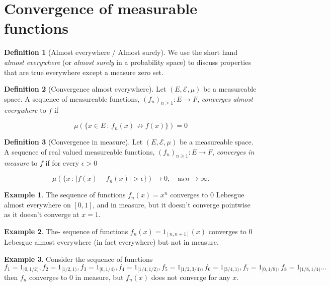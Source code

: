 \documentclass[
]{book}
\theoremstyle{definition}
\newtheorem{definition}{Definition}[chapter]
\theoremstyle{definition}
\newtheorem{example}{Example}[chapter]
\theoremstyle{definition}
\theoremstyle{definition}
\theoremstyle{remark}
\begin{document}
\hypertarget{convergence-of-measurable-functions}{%
\section{Convergence of measurable functions}\label{convergence-of-measurable-functions}}

\begin{definition}[Almost everywhere / Almost surely]
We use the short hand \emph{almost everywhere} (or \emph{almost surely} in a probability space) to discuss properties that are true everywhere except a measure zero set.
\end{definition}

\begin{definition}[Convergence almost everywhere]
Let \((E, \mathcal{E}, \mu)\) be a measureable space. A sequence of measureable functions, \((f_n)_{n \geq 1}: E \rightarrow F\), \emph{converges almost everywhere} to \(f\) if

\[ \mu \left( \{ x \in E \,:\, f_n(x) \not\to f(x) \} \right) = 0 \]
\end{definition}

\begin{definition}[Convergence in measure]
Let \((E, \mathcal{E}, \mu)\) be a measureable space. A sequence of real valued measureable functions, \((f_n)_{n \geq 1}: E \rightarrow F\), \emph{converges in measure} to \(f\) if for every \(\epsilon > 0\)

\[ \mu \left( \{ x \, :\, |f(x) - f_n(x)| > \epsilon \} \right) \rightarrow 0, \quad \mbox{as}\, n \rightarrow \infty. \]
\end{definition}

\begin{example}
The sequence of functions \(f_n(x) = x^n\) converges to \(0\) Lebesgue almost everywhere on \([0,1]\), and in measure, but it doesn't converge pointwise as it doesn't converge at \(x=1\).
\end{example}

\begin{example}
The- sequence of functions \(f_n(x) = 1_{[n,n+1]}(x)\) converges to 0 Lebesgue almost everywhere (in fact everywhere) but not in measure.
\end{example}

\begin{example}
Consider the sequence of functions \(f_1 = 1_{[0,1/2)}, f_2 = 1_{[1/2, 1)}, f_3 = 1_{[0,1/4)}, f_4 = 1_{[1/4, 1/2)}, f_5= 1_{[1/2, 3/4)}, f_6 = 1_{[3/4,1)}, f_7 = 1_{[0,1/8)}, f_8 = 1_{[1/8, 1/4)} \dots\) then \(f_n\) converges to 0 in measure, but \(f_n(x)\) does not converge for any \(x\).
\end{example}
\end{document}
